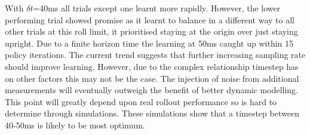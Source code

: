 \documentclass[twoside,twocolumn,12pt]{article}
\begin{document}
\newline
With $\delta t$=40ms all trials except one learnt more rapidly. However, the lower performing trial showed promise as it learnt to balance in a different way to all other trials at this roll limit, it prioritised staying at the origin over just staying upright. Due to a finite horizon time the learning at 50ms caught up within 15 policy iterations.
\newline
The current trend suggests that further increasing sampling rate should improve learning. However, due to the complex relationship timestep has on other factors this may not be the case. The injection of noise from additional measurements will eventually outweigh the benefit of better dynamic modelling. This point will greatly depend upon real rollout performance so is hard to determine through simulations.
\newline
These simulations show that a timestep between 40-50ms is likely to be most optimum.  



\end{document}
